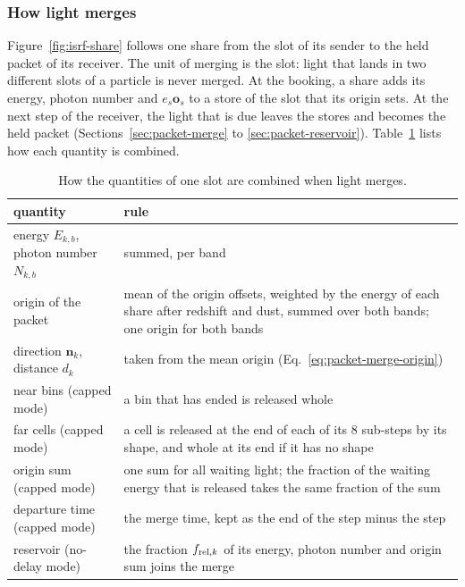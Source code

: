 \subsubsection{How light merges}
\label{sec:packet-merge-summary}

Figure~\ref{fig:isrf-share} follows one share from the slot of its sender to
the held packet of its receiver. The unit of merging is the slot: light that
lands in two different slots of a particle is never merged. At the booking, a
share adds its energy, photon number and $e_s\boldsymbol{o}_s$ to a store of
the slot that its origin sets. At the next step of the receiver, the light
that is due leaves the stores and becomes the held packet
(Sections~\ref{sec:packet-merge} to \ref{sec:packet-reservoir}).
Table~\ref{tab:isrf-merge-rules} lists how each quantity is combined.

\begin{table}[htbp]
\centering
\caption{How the quantities of one slot are combined when light merges.}
\label{tab:isrf-merge-rules}
\small
\begin{tabular}{>{\raggedright\arraybackslash}p{4.4cm}>{\raggedright\arraybackslash}p{9.8cm}}
\toprule
quantity & rule \\
\midrule
energy $E_{k,b}$, photon number $N_{k,b}$ & summed, per band \\
origin of the packet & mean of the origin offsets, weighted by the energy of
  each share after redshift and dust, summed over both bands; one origin for
  both bands \\
direction $\boldsymbol{n}_k$, distance $d_k$ & taken from the mean origin
  (Eq.~\eqref{eq:packet-merge-origin}) \\
near bins (capped mode) & a bin that has ended is released whole \\
far cells (capped mode) & a cell is released at the end of each of its $8$ sub-steps by its shape, and whole at its end if it has no shape \\
origin sum (capped mode) & one sum for all waiting light; the fraction of the
  waiting energy that is released takes the same fraction of the sum \\
departure time (capped mode) & the merge time, kept as the end of the step minus the step \\
reservoir (no-delay mode) & the fraction $f_{{\rm rel},k}$ of its energy,
  photon number and origin sum joins the merge \\
\bottomrule
\end{tabular}
\end{table}

